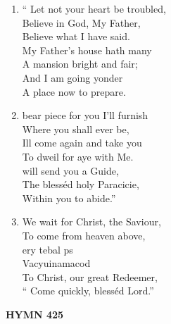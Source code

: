 \documentclass[11pt,a4paper]{article}
\begin{document}
\begin{enumerate}
    \item `` Let not your heart be troubled, \\
        Believe in God, My Father, \\
        Believe what I have said. \\
        My Father's house hath many \\
        A mansion bright and fair; \\
        And I am going yonder \\
        A place now to prepare.

    \item bear piece for you I'll furnish \\
        Where you shall ever be, \\
        Ill come again and take you \\
        To dweil for aye with Me. \\
        will send you a Guide, \\
        The blesséd holy Paracicie, \\
        Within you to abide.''

    \item We wait for Christ, the Saviour, \\
        To come from heaven above, \\
        ery tebal ps \\
        Vacyuinamacod \\
        To Christ, our great Redeemer, \\
        `` Come quickly, blesséd Lord.''

\end{enumerate}

\newpage
\begin{center}
    {\Large \textbf{HYMN 425}}
\end{center}
\vspace{1em}
\end{document}
